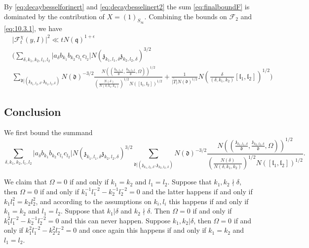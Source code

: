 \documentclass[a4paper,11pt]{amsart}
\theoremstyle{definition}
\begin{document}
By \eqref{eq:decaybesselforinert} and \eqref{eq:decaybesselinert2} the sum \eqref{eq:finalboundF} is dominated by the contribution of $X=(1)_{S_\infty}$. Combining the bounds on $\mathcal{F}_2$ and \eqref{eq:10.3.1}, we have 
\begin{align*}
    &\vert{\mathcal{F}^{\chi}_{t}(y,I)}\vert^2 \ll tN(\mathfrak{q})^{1+\epsilon} \\ &\bigg( \sum_{\delta, k_1,k_2,l_1,l_2}\vert{a_{\delta}b_{k_1}b_{k_2}c_{l_1}c_{l_2}}\vert N(\mathfrak{z}_{k_1,l_1,\delta}\mathfrak{z}_{k_2,l_2,\delta})^{3/2}\\& \sum_{\mathfrak{d}|(\mathfrak{z}_{k_1,l_2,\delta},\mathfrak{z}_{k_2,l_2,\delta})}N(\mathfrak{d})^{-3/2}\frac{N\left((\frac{\mathfrak{z}_{k_1,l_1,\delta}}{\mathfrak{d}},\frac{\mathfrak{z}_{k_2,l_2,\delta}}{\mathfrak{d}},\Omega)\right)^{1/2}}{(\frac{N(\delta)}{N(\delta,k_1,k_2)})^{1/2}N([\mathfrak{l}_1,\mathfrak{l}_2])^{1/2}} +  \frac{1}{\vert{\tilde{T}}\vert N(\mathfrak{d})^{1/2}}N\left(\frac{\delta}{(\delta,k_1,k_2)}[\mathfrak{l}_1,\mathfrak{l}_{2}]\right)^{1/2}\bigg)
\end{align*}

\subsection{Conclusion}
We first bound the summand \begin{equation}\label{eq:finalFpart1} \sum_{\delta, k_1,k_2,l_1,l_2}\vert a_\delta b_{k_1}b_{k_2}c_{l_1}c_{l_2}\vert N(\mathfrak{z}_{k_1,l_1,\delta}\mathfrak{z}_{k_2,l_2,\delta})^{3/2}\sum_{\mathfrak{d}|(\mathfrak{z}_{k_1,l_2,\delta},\mathfrak{z}_{k_2,l_2,\delta})}N(\mathfrak{d})^{-3/2}\frac{N\left((\frac{\mathfrak{z}_{k_1,l_1,\delta}}{\mathfrak{d}},\frac{\mathfrak{z}_{k_2,l_2,\delta}}{\mathfrak{d}},\Omega)\right)^{1/2}}{(\frac{N(\delta)}{N(\delta,k_1,k_2)})^{1/2}N([\mathfrak{l}_1,\mathfrak{l}_2])^{1/2}}.\end{equation}

 We claim that $\Omega =0$ if and only if $k_1=k_2$ and $l_1=l_2$. Suppose that $k_1,k_2\nmid \delta$, then $\Omega = 0$ if and only if $k_1^{-1}l_1^{-2}-k_2^{-1}l_2^{-2}=0$ and the latter happens if and only if $k_1l_1^2 = k_2l_2^2$, and according to the assumptions on $k_i,l_i$ this happens if and only if $k_1 = k_2$ and $l_1= l_2$.   
Suppose that $k_1|\delta$ and $k_2\nmid \delta$. Then $\Omega = 0$ if and only if $k_1^2l_1^{-2}-k_2^{-1}l_2^{-2}=0$ and this can never happen. Suppose $k_1,k_2|\delta$, then $\Omega = 0$ if and only if $k_1^2l_1^{-2}-k_2^2l_2^{-2} =0$ and once again this happens if and only if $k_1 = k_2$ and $l_1 = l_2$.
\end{document}
